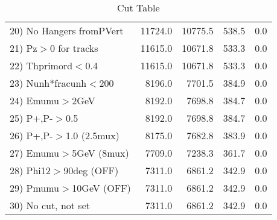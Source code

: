 \begin{table}[h!]
\begin{tabular}{||l||r|r|r|r||}
 20) No Hangers fromPVert &     11724.0 &     10775.5 &       538.5 &         0.0 \\
 21) Pz$>$0 for tracks    &     11615.0 &     10671.8 &       533.3 &         0.0 \\
 22) Thprimord$<$0.4      &     11615.0 &     10671.8 &       533.3 &         0.0 \\
 23) Nunh*fracunh$<$200   &      8196.0 &      7701.5 &       384.9 &         0.0 \\
 24) Emumu$>$2GeV         &      8192.0 &      7698.8 &       384.7 &         0.0 \\
 25) P+,P-$>$0.5          &      8192.0 &      7698.8 &       384.7 &         0.0 \\
 26) P+,P-$>$1.0 (2.5mux) &      8175.0 &      7682.8 &       383.9 &         0.0 \\
 27) Emumu$>$5GeV  (8mux) &      7709.0 &      7238.3 &       361.7 &         0.0 \\
 28) Phi12$>$90deg  (OFF) &      7311.0 &      6861.2 &       342.9 &         0.0 \\
 29) Pmumu$>$10GeV  (OFF) &      7311.0 &      6861.2 &       342.9 &         0.0 \\
 30) No cut, not set      &      7311.0 &      6861.2 &       342.9 &         0.0 \\
 \hline
 \hline
 \end{tabular}
 \caption{Cut Table \cohrp  }
 \label{tab-cut_crhop}
 \end{table}
